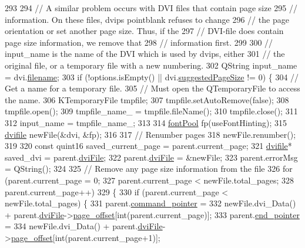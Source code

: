 \begin{DoxyCode}
{293 
294   \textcolor{comment}{// A similar problem occurs with DVI files that contain page size}
295   \textcolor{comment}{// information. On these files, dvips pointblank refuses to change}
296   \textcolor{comment}{// the page orientation or set another page size. Thus, if the}
297   \textcolor{comment}{// DVI-file does contain page size information, we remove that}
298   \textcolor{comment}{// information first.}
299 
300   \textcolor{comment}{// input\_name is the name of the DVI which is used by dvips, either}
301   \textcolor{comment}{// the original file, or a temporary file with a new numbering.}
302   QString input\_name = dvi.\hyperlink{classdvifile_a1c0fe420231e71f256b5db367b7e1178}{filename};
303   \textcolor{keywordflow}{if} (!options.isEmpty() || dvi.\hyperlink{classdvifile_a9fdbeee20bb39fcafe317925767b24ef}{suggestedPageSize} != 0) \{
304     \textcolor{comment}{// Get a name for a temporary file.}
305     \textcolor{comment}{// Must open the QTemporaryFile to access the name.}
306     KTemporaryFile tmpfile;
307     tmpfile.setAutoRemove(\textcolor{keyword}{false});
308     tmpfile.open();
309     tmpfile\_name\_ = tmpfile.fileName();
310     tmpfile.close();
311 
312     input\_name = tmpfile\_name\_;
313 
314     \hyperlink{classfontPool}{fontPool} fp(useFontHinting);
315     \hyperlink{classdvifile}{dvifile} newFile(&dvi, &fp);
316 
317     \textcolor{comment}{// Renumber pages}
318     newFile.renumber();
319 
320     \textcolor{keyword}{const} quint16 saved\_current\_page = parent.current\_page;
321     \hyperlink{classdvifile}{dvifile}* saved\_dvi = parent.\hyperlink{classdviRenderer_a67ded13a1a8da343aa0ee921ed96d4c2}{dviFile};
322     parent.\hyperlink{classdviRenderer_a67ded13a1a8da343aa0ee921ed96d4c2}{dviFile} = &newFile;
323     parent.errorMsg = QString();
324 
325     \textcolor{comment}{// Remove any page size information from the file}
326     \textcolor{keywordflow}{for} (parent.current\_page = 0;
327         parent.current\_page < newFile.total\_pages;
328         parent.current\_page++)
329     \{
330       \textcolor{keywordflow}{if} (parent.current\_page < newFile.total\_pages) \{
331         parent.\hyperlink{classbigEndianByteReader_aa8919f6fe116fd3230337675fd23abac}{command\_pointer} =
332           newFile.dvi\_Data() + parent.\hyperlink{classdviRenderer_a67ded13a1a8da343aa0ee921ed96d4c2}{dviFile}->\hyperlink{classdvifile_aeafc97277647ad5077a774be71b3253a}{page\_offset}[int(parent.current\_page)];
333         parent.\hyperlink{classbigEndianByteReader_ace2790221530572c87c58f1f77924beb}{end\_pointer} =
334           newFile.dvi\_Data() + parent.\hyperlink{classdviRenderer_a67ded13a1a8da343aa0ee921ed96d4c2}{dviFile}->\hyperlink{classdvifile_aeafc97277647ad5077a774be71b3253a}{page\_offset}[int(parent.current\_page+1)];
}
\end{DoxyCode}
